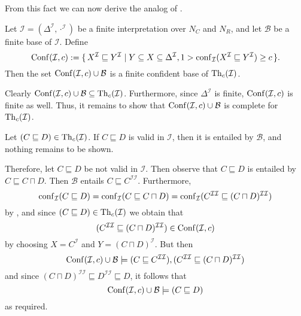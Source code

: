 From this fact we can now derive the analog of .

\begin{Theorem}
  Let $\mathcal{I} = (\Delta^{\mathcal{I}}, \cdot^{\mathcal{I}})$ be a finite
  interpretation over $N_C$ and $N_R$, and let $\mathcal{B}$ be a finite base of
  $\mathcal{I}$.  Define
  \begin{equation*}
    \operatorname{Conf}(\mathcal{I}, c) := {\{\, X^{\mathcal{I}} \sqsubseteq Y^{\mathcal{I}} \mid Y
      \subseteq X \subseteq \Delta^{\mathcal{I}}, 1 > \operatorname{conf}_{\mathcal{I}}( X^{\mathcal{I}}
      \sqsubseteq Y^{\mathcal{I}} ) \ge c \,\}}.
  \end{equation*}
  Then the set $\operatorname{Conf}(\mathcal{I}, c) \cup \mathcal{B}$ is a finite confident base of
  $\operatorname{Th}_c(\mathcal{I})$.
\end{Theorem}
\begin{Proof}
  Clearly $\operatorname{Conf}(\mathcal{I}, c) \cup \mathcal{B} \subseteq \operatorname{Th}_c(\mathcal{I})$.
  Furthermore, since $\Delta^{\mathcal{I}}$ is finite, $\operatorname{Conf}(\mathcal{I}, c)$ is finite
  as well.  Thus, it remains to show that $\operatorname{Conf}(\mathcal{I}, c) \cup \mathcal{B}$ is
  complete for $\operatorname{Th}_c(\mathcal{I})$.

  Let $(C \sqsubseteq D) \in \operatorname{Th}_c(\mathcal{I})$.  If $C \sqsubseteq D$ is valid in
  $\mathcal{I}$, then it is entailed by $\mathcal{B}$, and nothing remains to be shown.

  Therefore, let $C \sqsubseteq D$ be not valid in $\mathcal{I}$.  Then observe that $C
  \sqsubseteq D$ is entailed by $C \sqsubseteq C \sqcap D$.  Then $\mathcal{B}$ entails $C
  \sqsubseteq C^{\mathcal{I}\mathcal{I}}$.  Furthermore,
  \begin{equation*}
    \operatorname{conf}_{\mathcal{I}}( C \sqsubseteq D ) = \operatorname{conf}_{\mathcal{I}}( C \sqsubseteq C \sqcap D
    ) = \operatorname{conf}_{\mathcal{I}}( C^{\mathcal{I}\mathcal{I}} \sqsubseteq (C \sqcap
    D)^{\mathcal{I}\mathcal{I}} )
  \end{equation*}
  by , and since $(C \sqsubseteq D) \in
  \operatorname{Th}_c(\mathcal{I})$ we obtain that
  \begin{equation*}
    (C^{\mathcal{I}\mathcal{I}} \sqsubseteq (C \sqcap D)^{\mathcal{I}\mathcal{I}}) \in
    \operatorname{Conf}(\mathcal{I}, c)
  \end{equation*}
  by choosing $X = C^{\mathcal{I}}$ and $Y = (C \sqcap D)^{\mathcal{I}}$.  But then
  \begin{equation*}
    \operatorname{Conf}(\mathcal{I}, c) \cup \mathcal{B} \models (C \sqsubseteq
    C^{\mathcal{I}\mathcal{I}}), (C^{\mathcal{I}\mathcal{I}} \sqsubseteq (C \sqcap
    D)^{\mathcal{I}\mathcal{I}})
  \end{equation*}
  and since $(C \sqcap D)^{\mathcal{I}\mathcal{I}} \sqsubseteq D^{\mathcal{I}\mathcal{I}}
  \sqsubseteq D$, it follows that
  \begin{equation*}
    \operatorname{Conf}(\mathcal{I}, c) \cup \mathcal{B} \models (C \sqsubseteq D)
  \end{equation*}
  as required.
\end{Proof}

